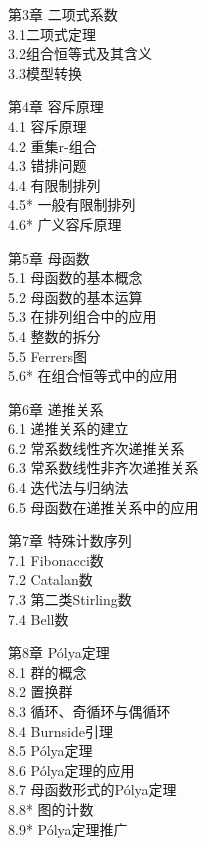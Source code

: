 \documentclass[oneside]{book}
\theoremstyle{definition}
\begin{document}
 第3章  二项式系数\\
 3.1二项式定理\\
 3.2组合恒等式及其含义\\
 3.3模型转换
 
 第4章 容斥原理\\
 4.1  容斥原理\\
 4.2  重集r-组合\\
 4.3  错排问题\\
 4.4  有限制排列\\
 4.5*  一般有限制排列\\
 4.6*  广义容斥原理

 第5章  母函数\\
 5.1  母函数的基本概念\\
 5.2  母函数的基本运算\\
 5.3  在排列组合中的应用\\
 5.4  整数的拆分\\
 5.5  Ferrers图\\
 5.6*  在组合恒等式中的应用  
 
 第6章  递推关系\\
 6.1  递推关系的建立\\
 6.2  常系数线性齐次递推关系\\
 6.3  常系数线性非齐次递推关系\\
 6.4  迭代法与归纳法\\
 6.5  母函数在递推关系中的应用
 
 第7章 特殊计数序列\\
 7.1  Fibonacci数\\
 7.2  Catalan数\\
 7.3  第二类Stirling数\\
 7.4  Bell数  

 第8章  Pólya定理\\
 8.1  群的概念\\
 8.2  置换群\\
 8.3  循环、奇循环与偶循环  \\
 8.4  Burnside引理\\
 8.5  Pólya定理\\
 8.6  Pólya定理的应用\\
 8.7  母函数形式的Pólya定理\\
 8.8*  图的计数\\
 8.9*  Pólya定理推广
 
 
\end{document}
